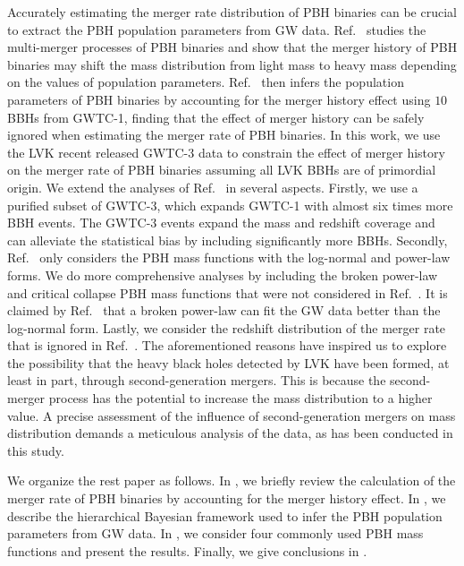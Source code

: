 \documentclass[
reprint,           %
superscriptaddress,%
amsmath,           %
amssymb,           %
aps,               %
prd,               %
notitlepage,       %
longbibliography,  %
floatfix,          %
nofootinbib,
]{revtex4-1}
\begin{document}
Accurately estimating the merger rate distribution of PBH binaries can be crucial to extract the PBH population parameters from GW data. Ref.~\cite{Liu:2019rnx} studies the multi-merger processes of PBH binaries and show that the merger history of PBH binaries may shift the mass distribution from light mass to heavy mass depending on the values of population parameters. Ref.~\cite{Wu:2020drm} then infers the population parameters of PBH binaries by accounting for the merger history effect using $10$ BBHs from GWTC-1, finding that the effect of merger history can be safely ignored when estimating the merger rate of PBH binaries. 
In this work, we use the LVK recent released GWTC-3 data to constrain the effect of merger history on the merger rate of PBH binaries assuming all LVK BBHs are of primordial origin.
We extend the analyses of Ref.~\cite{Wu:2020drm} in several aspects. Firstly, we use a purified subset of GWTC-3, which expands GWTC-1 with almost six times more BBH events. The GWTC-3 events expand the mass and redshift coverage and can alleviate the statistical bias by including significantly more BBHs. Secondly, Ref.~\cite{Wu:2020drm} only considers the PBH mass functions with the log-normal and power-law forms. We do more comprehensive analyses by including the broken power-law and critical collapse PBH mass functions that were not considered in Ref.~\cite{Wu:2020drm}. It is claimed by Ref.~\cite{Deng:2021ezy} that a broken power-law can fit the GW data better than the log-normal form. Lastly, we consider the redshift distribution of the merger rate that is ignored in Ref.~\cite{Wu:2020drm}.
The aforementioned reasons have inspired us to explore the possibility that the heavy black holes detected by LVK have been formed, at least in part, through second-generation mergers. This is because the second-merger process has the potential to increase the mass distribution to a higher value. A precise assessment of the influence of second-generation mergers on mass distribution demands a meticulous analysis of the data, as has been conducted in this study.

We organize the rest paper as follows.
In , we briefly review the calculation of the merger rate of PBH binaries by accounting for the merger history effect.
In , we describe the hierarchical Bayesian framework used to infer the PBH population parameters from GW data.
In , we consider four commonly used PBH mass functions and present the results.
Finally, we give conclusions in .
\end{document}
